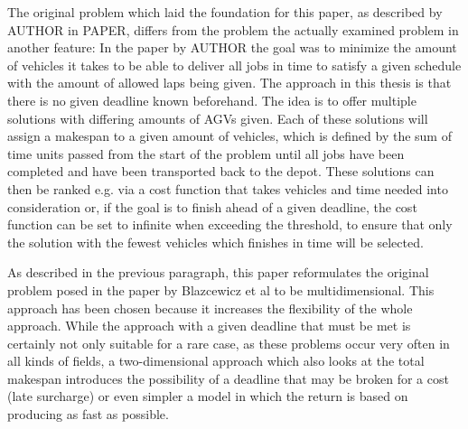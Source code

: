The original problem which laid the foundation for this paper, as described by AUTHOR in PAPER, differs from the problem the actually examined
problem in another feature: In the paper by AUTHOR the goal was to minimize the amount of vehicles it takes to be able to
deliver all jobs in time to satisfy a given schedule with the amount of allowed laps being given. The approach in this thesis is that there is no
given deadline known beforehand. The idea is to offer multiple solutions with differing amounts of AGVs given. Each of these solutions will assign
a makespan to a given amount of vehicles, which is defined by the sum of time units passed from the start of the problem until all jobs have been
completed and have been transported back to the depot. These solutions can then be ranked e.g. via
a cost function that takes vehicles and time needed into consideration or, if the goal is to finish ahead of a given deadline, the cost function
can be set to infinite when exceeding the threshold, to ensure that only the solution with the fewest vehicles which finishes in time will be selected.

As described in the previous paragraph, this paper reformulates the original problem posed in the paper by Blazcewicz et al to be multidimensional. This
approach has been chosen because it increases the flexibility of the whole approach. While the approach with a given deadline that must be met
is certainly not only suitable for a rare case, as these problems occur very often in all kinds of fields, a two-dimensional approach which also
looks at the total makespan introduces the possibility of a deadline that may be broken for a cost (late surcharge) or even simpler a model in
which the return is based on producing as fast as possible.










